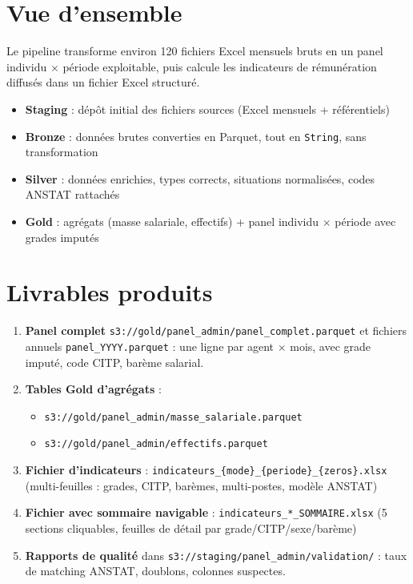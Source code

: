 \documentclass[12pt,a4paper,french]{report}
\newcommand{\bucket}[1]{\texttt{s3://#1}}
\begin{document}
\section{Vue d'ensemble}

Le pipeline transforme environ 120 fichiers Excel mensuels bruts en un panel
individu $\times$ période exploitable, puis calcule les indicateurs de
rémunération diffusés dans un fichier Excel structuré.

\begin{infobox}
  \begin{itemize}[nosep]
    \item \textbf{Staging} : dépôt initial des fichiers sources (Excel mensuels +
          référentiels)
    \item \textbf{Bronze} : données brutes converties en Parquet, tout en
          \texttt{String}, sans transformation
    \item \textbf{Silver} : données enrichies, types corrects, situations
          normalisées, codes ANSTAT rattachés
    \item \textbf{Gold} : agrégats (masse salariale, effectifs) + panel
          individu $\times$ période avec grades imputés
  \end{itemize}
\end{infobox}

\section{Livrables produits}

\begin{enumerate}
  \item \textbf{Panel complet} \bucket{gold/panel\_admin/panel\_complet.parquet}
        et fichiers annuels \texttt{panel\_YYYY.parquet} : une ligne par
        agent $\times$ mois, avec grade imputé, code CITP, barème salarial.

  \item \textbf{Tables Gold d'agrégats} :
        \begin{itemize}[nosep]
          \item \bucket{gold/panel\_admin/masse\_salariale.parquet}
          \item \bucket{gold/panel\_admin/effectifs.parquet}
        \end{itemize}

  \item \textbf{Fichier d'indicateurs} : \texttt{indicateurs\_\{mode\}\_\{periode\}\_\{zeros\}.xlsx}
        (multi-feuilles : grades, CITP, barèmes, multi-postes, modèle ANSTAT)

  \item \textbf{Fichier avec sommaire navigable} : \texttt{indicateurs\_*\_SOMMAIRE.xlsx}
        (5 sections cliquables, feuilles de détail par grade/CITP/sexe/barème)

  \item \textbf{Rapports de qualité} dans \bucket{staging/panel\_admin/validation/} :
        taux de matching ANSTAT, doublons, colonnes suspectes.
\end{enumerate}
\end{document}
